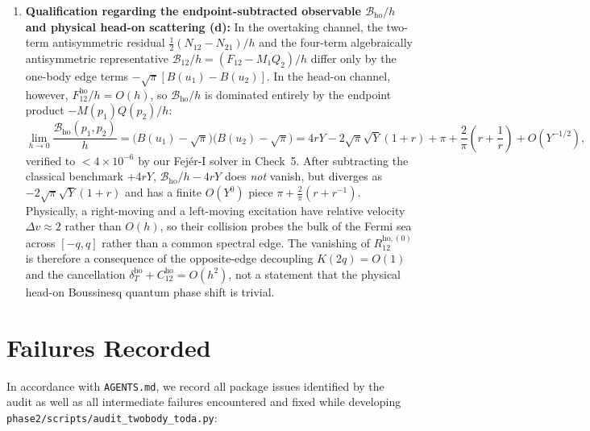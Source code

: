 \documentclass[11pt,a4paper]{article}
\begin{document}
\begin{enumerate}[leftmargin=2em]
  \item \textbf{Qualification regarding the endpoint-subtracted observable $\mathcal{B}_{\mathrm{ho}}/h$ and physical head-on scattering (d):}
  In the overtaking channel, the two-term antisymmetric residual $\frac12(N_{12}-N_{21})/h$ and the four-term algebraically antisymmetric representative $\mathcal{B}_{12}/h=(F_{12}-M_1 Q_2)/h$ differ only by the one-body edge terms $-\sqrt{\pi}[B(u_1)-B(u_2)]$. In the head-on channel, however, $F_{12}^{\mathrm{ho}}/h=O(h)$, so $\mathcal{B}_{\mathrm{ho}}/h$ is dominated entirely by the endpoint product $-M(p_1)Q(p_2)/h$:
  \begin{equation}\label{eq:B_ho}
    \lim_{h\to 0}\frac{\mathcal{B}_{\mathrm{ho}}(p_1,p_2)}{h} = \bigl(B(u_1)-\sqrt{\pi}\bigr)\bigl(B(u_2)-\sqrt{\pi}\bigr) = 4rY - 2\sqrt{\pi}\sqrt{Y}(1+r) + \pi + \frac{2}{\pi}\!\left(r+\frac{1}{r}\right) + O(Y^{-1/2}),
  \end{equation}
  verified to $<4\times 10^{-6}$ by our Fej\'er-I solver in Check~5. After subtracting the classical benchmark $+4rY$, $\mathcal{B}_{\mathrm{ho}}/h - 4rY$ does \emph{not} vanish, but diverges as $-2\sqrt{\pi}\sqrt{Y}(1+r)$ and has a finite $O(Y^0)$ piece $\pi+\frac{2}{\pi}(r+r^{-1})$. Physically, a right-moving and a left-moving excitation have relative velocity $\Delta v \approx 2$ rather than $O(h)$, so their collision probes the bulk of the Fermi sea across $[-q,q]$ rather than a common spectral edge. The vanishing of $R_{12}^{\mathrm{ho},(0)}$ is therefore a consequence of the opposite-edge decoupling $K(2q)=O(1)$ and the cancellation $\delta_T^{\mathrm{ho}}+C_{12}^{\mathrm{ho}}=O(h^2)$, not a statement that the physical head-on Boussinesq quantum phase shift is trivial.
\end{enumerate}

\section{Failures Recorded}
\label{sec:failures}

In accordance with \texttt{AGENTS.md}, we record all package issues identified by the audit as well as all intermediate failures encountered and fixed while developing \texttt{phase2/scripts/audit\_twobody\_toda.py}:
\end{document}
